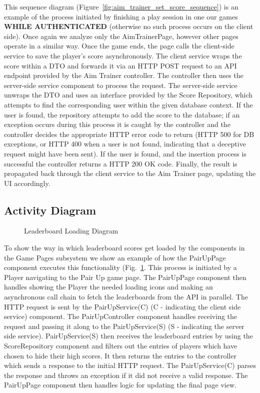 \documentclass[11pt,a4paper]{article}
\newcommand{\inputdiagram}[1]{}
\begin{document}
This sequence diagram (Figure~\ref{fig:aim_trainer_set_score_sequence})
is an example of the process initiated by finishing a play session in one
our games \textbf{WHILE AUTHENTICATED} (otherwise no such process occurs
on the client side). Once again we analyze only the AimTrainerPage, however
other pages operate in a similar way. Once the game ends, the page calls the
client-side service to save the player's score asynchronously. The client
service wraps the score within a DTO and forwards it via an HTTP POST request
to an API endpoint provided by the Aim Trainer controller. The controller
then uses the server-side service component to process the request. The
server-side service unwraps the DTO and uses an interface provided by the
Score Repository, which attempts to find the corresponding user within the
given database context.  If the user is found, the repository attempts to
add the score to the database; if an exception occurs during this process it
is caught by the controller and the controller decides the appropriate HTTP
error code to return (HTTP 500 for DB exceptions, or HTTP 400 when a user
is not found, indicating that a deceptive request might have been sent). If
the user is found, and the insertion process is successful the controller
returns a HTTP 200 OK code. Finally, the result is propagated back through
the client service to the Aim Trainer page, updating the UI accordingly.

\subsection{Activity Diagram}
\begin{figure}[H]
    \centering
     \begin{adjustbox}{width=0.92\paperwidth,center}
        \inputdiagram{leaderboard_activity.tex}
     \end{adjustbox}
    \caption{Leaderboard Loading Diagram}
    \label{fig:leaderboard_activity}
\end{figure}

To show the way in which leaderboard scores get loaded by the components in
the Game Pages subsystem we show an example of how the PairUpPage component
executes this functionality (Fig.~\ref{fig:leaderboard_activity}.  This process
is initiated by a Player navigating to the Pair Up game page. The PairUpPage
component then handles showing the Player the needed loading icons and making
an asynchronous call chain to fetch the leaderboards from the API in parallel.
The HTTP request is sent by the PairUpService(C) (C - indicating the client
side service) component.  The PairUpController component handles receiving
the request and passing it along to the PairUpService(S) (S - indicating
the server side service).  PairUpService(S) then receives the leaderboard
entries by using the ScoreRepository component and filters out the entries
of players which have chosen to hide their high scores.  It then returns the
entries to the controller which sends a response to the initial HTTP request.
The PairUpService(C) parses the response and throws an exception if it did
not receive a valid response.  The PairUpPage component then handles logic
for updating the final page view.
\end{document}
